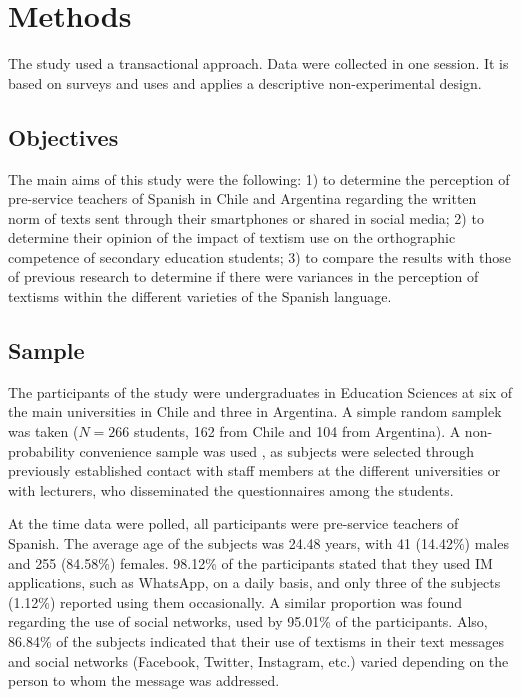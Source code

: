 \documentclass{textolivre}
\begin{document}
\section{Methods}\label{Methods}
The study used a transactional approach. Data were collected in one session. It is based on surveys and uses and applies a descriptive non-experimental design.

\subsection{Objectives}
The main aims of this study were the following: 1) to determine the perception of pre-service teachers of Spanish in Chile and Argentina regarding the written norm of texts sent through their smartphones or shared in social media; 2) to determine their opinion of the impact of textism use on the orthographic competence of secondary education students; 3) to compare the results with those of previous research to determine if there were variances in the perception of textisms within the different varieties of the Spanish language.

\subsection{Sample}
The participants of the study were undergraduates in Education Sciences at six of the main universities in Chile and three in Argentina. A simple random samplek was taken ($N= 266$ students, 162 from Chile and 104 from Argentina). A non-probability convenience sample was used \cite{SabariegoPuig2004}, as subjects were selected through previously established contact with staff members at the different universities or with lecturers, who disseminated the questionnaires among the students.

At the time data were polled, all participants were pre-service teachers of Spanish. The average age of the subjects was 24.48 years, with 41 (14.42\%) males and 255 (84.58\%) females. 98.12\% of the participants stated that they used IM applications, such as WhatsApp, on a daily basis, and only three of the subjects (1.12\%) reported using them occasionally. A similar proportion was found regarding the use of social networks, used by 95.01\% of the participants. Also, 86.84\% of the subjects indicated that their use of textisms in their text messages and social networks (Facebook, Twitter, Instagram, etc.) varied depending on the person to whom the message was addressed.  
\end{document}
